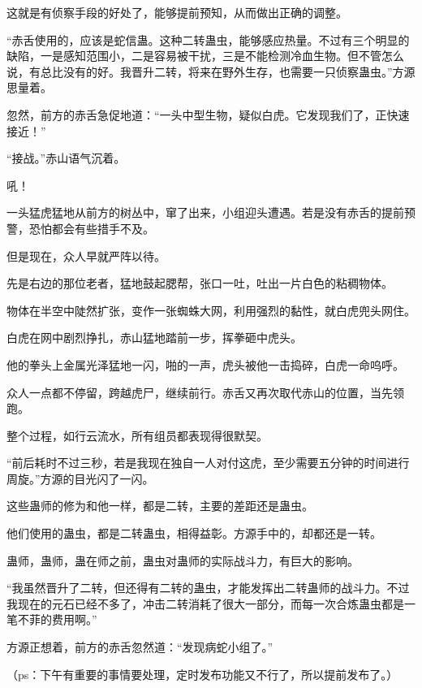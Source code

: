 \begin{this_body}
这就是有侦察手段的好处了，能够提前预知，从而做出正确的调整。

“赤舌使用的，应该是蛇信蛊。这种二转蛊虫，能够感应热量。不过有三个明显的缺陷，一是感知范围小，二是容易被干扰，三是不能检测冷血生物。但不管怎么说，有总比没有的好。我晋升二转，将来在野外生存，也需要一只侦察蛊虫。”方源思量着。

忽然，前方的赤舌急促地道：“一头中型生物，疑似白虎。它发现我们了，正快速接近！”

“接战。”赤山语气沉着。

吼！

一头猛虎猛地从前方的树丛中，窜了出来，小组迎头遭遇。若是没有赤舌的提前预警，恐怕都会有些措手不及。

但是现在，众人早就严阵以待。

先是右边的那位老者，猛地鼓起腮帮，张口一吐，吐出一片白色的粘稠物体。

物体在半空中陡然扩张，变作一张蜘蛛大网，利用强烈的黏性，就白虎兜头网住。

白虎在网中剧烈挣扎，赤山猛地踏前一步，挥拳砸中虎头。

他的拳头上金属光泽猛地一闪，啪的一声，虎头被他一击捣碎，白虎一命呜呼。

众人一点都不停留，跨越虎尸，继续前行。赤舌又再次取代赤山的位置，当先领跑。

整个过程，如行云流水，所有组员都表现得很默契。

“前后耗时不过三秒，若是我现在独自一人对付这虎，至少需要五分钟的时间进行周旋。”方源的目光闪了一闪。

这些蛊师的修为和他一样，都是二转，主要的差距还是蛊虫。

他们使用的蛊虫，都是二转蛊虫，相得益彰。方源手中的，却都还是一转。

蛊师，蛊师，蛊在师之前，蛊虫对蛊师的实际战斗力，有巨大的影响。

“我虽然晋升了二转，但还得有二转的蛊虫，才能发挥出二转蛊师的战斗力。不过我现在的元石已经不多了，冲击二转消耗了很大一部分，而每一次合炼蛊虫都是一笔不菲的费用啊。”

方源正想着，前方的赤舌忽然道：“发现病蛇小组了。”

（ps：下午有重要的事情要处理，定时发布功能又不行了，所以提前发布了。）

\end{this_body}

